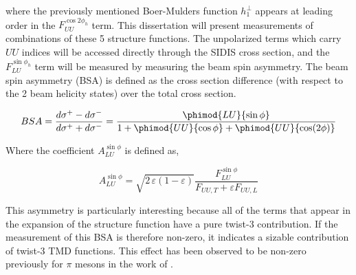 where the previously mentioned Boer-Mulders function $h_{1}^{\perp}$ appears at leading order in the $F_{UU}^{\cos 2\phi_h}$ term.  This dissertation will present measurements of combinations of these 5 structure functions.  The unpolarized terms which carry $UU$ indices will be accessed directly through the SIDIS cross section, and the $F_{LU}^{\sin\phi_h}$ term will be measured by measuring the beam spin asymmetry.  The beam spin asymmetry (BSA) is defined as the cross section difference (with respect to the 2 beam helicity states) over the total cross section.

\begin{equation}
  BSA = \frac{d\sigma^+ - d\sigma^-}{d\sigma^+ + d\sigma^-} = \frac{\phimod{LU}{\sin\phi}}{1 + \phimod{UU}{\cos\phi} + \phimod{UU}{\cos(2\phi)}}
\end{equation}

Where the coefficient $A_{LU}^{\sin\phi}$ is defined as, 

\begin{equation}
  A_{LU}^{\sin\phi} = \sqrt{2\,\varepsilon (1-\varepsilon)} \frac{F_{LU}^{\sin\phi}}{F_{UU,T} + \varepsilon F_{UU,L}}
\end{equation}

This asymmetry is particularly interesting because all of the terms that appear in the expansion of the structure function have a pure twist-3 contribution.  If the measurement of this BSA is therefore non-zero, it indicates a sizable contribution of twist-3 TMD functions.  This effect has been observed to be non-zero previously for $\pi$ mesons in the work of \cite{tmds-gohn:2014}.  

